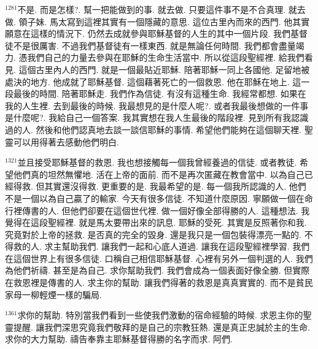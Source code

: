 \documentclass{book}
\begin{document}
$^{1281}$不是.
而是怎樣?.
幫一把能做到的事.
就去做.
只要這件事不是不合真理.
就去做.
領子妹.
馬太寫到這裡其實有一個隱藏的意思.
這位古里內而來的西門.
他其實願意在這樣的情況下.
仍然去成就參與耶穌基督的人生的其中一個片段.
我們基督徒不是很厲害.
不過我們基督徒有一樣東西.
就是無論任何時間.
我們都會盡量竭力.
憑我們自己的力量去參與在耶穌的生命生活當中.
所以從這段聖經裡.
給我們看見.
這個古里內人的西門.
就是一個最貼近耶穌.
陪著耶穌一同上各國他.
足留地被處決的地方.
他成就了耶穌基督.
這個藉著死亡的一個救恩.
他在耶穌在地上.
這一段最後的時間.
陪著耶穌走.
我們作為信徒.
有沒有這種生命.
我經常都想.
如果在我的人生裡.
去到最後的時候.
我最想見的是什麼人呢?.
或者我最後想做的一件事是什麼呢?.
我給自己一個答案.
我其實想在我人生最後的階段裡.
見到所有我認識過的人.
然後和他們認真地去談一談信耶穌的事情.
希望他們能夠在這個聊天裡.
聖靈可以用得著去感動他們明白.

$^{1321}$並且接受耶穌基督的救恩.
我也想接觸每一個我曾經養過的信徒.
或者教徒.
希望他們真的坦然無懼地.
活在上帝的面前.
而不是再次匿藏在教會當中.
以為自己已經得救.
但其實還沒得救.
更重要的是.
我最希望的是.
每一個我所認識的人.
他們不是一個以為自己贏了的輸家.
今天有很多信徒.
不知道什麼原因.
寧願做一個在命行裡傳書的人.
但他們卻要在這個世代裡.
做一個好像全部得勝的人.
這種想法.
我覺得在這段聖經裡.
就是馬太要帶出來的訊息.
耶穌的受死.
其實是反照著你和我.
究竟對於上帝的拯救.
是否真的完全的毀身.
還是我只是一個包裝得漂亮一點的.
不得救的人.
求主幫助我們.
讓我們一起和心底人道過.
讓我在這段聖經裡學習.
我們在這個世界上有很多信徒.
口稱自己相信耶穌基督.
心裡有另外一個判選的人.
我們為他們祈禱.
甚至是為自己.
求你幫助我們.
我們會成為一個表面好像全勝.
但實際在救恩裡是傳書的人.
求主你的幫助.
讓我們得著的救恩是真真實實的.
而不是貧民家母一柳輕煙一樣的騙局.

$^{1361}$求你的幫助.
特別當我們看到一些使我們激動的宿命經驗的時候.
求恩主你的聖靈提醒.
讓我們深思究竟我們敬拜的是自己的宗教狂熱.
還是真正忠誠於主的生命.
求你的大力幫助.
禱告奉靠主耶穌基督得勝的名字而求.
阿們.
\newpage
\end{document}
